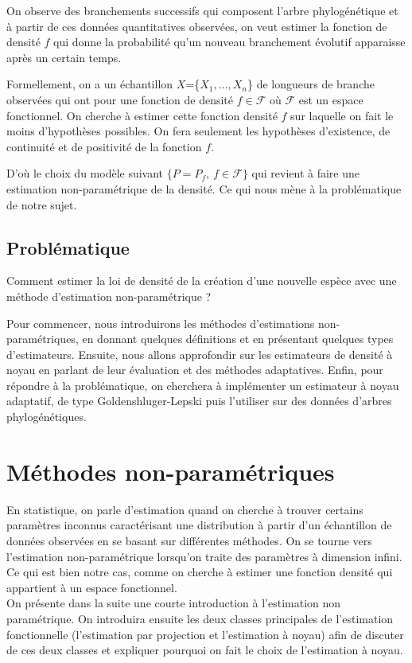\documentclass[
]{article}
\begin{document}
\hspace*{0.5cm}

On observe des branchements successifs qui composent l'arbre
phylogénétique et à partir de ces données quantitatives observées, on
veut estimer la fonction de densité \(f\) qui donne la probabilité qu'un
nouveau branchement évolutif apparaisse après un certain temps.

Formellement, on a un échantillon \(X\)=\{\(X_1,\dots,X_n\)\} de
longueurs de branche observées qui ont pour une fonction de densité
\(f \in \mathcal F\) où \(\mathcal F\) est un espace fonctionnel. On
cherche à estimer cette fonction densité \(f\) sur laquelle on fait le
moins d'hypothèses possibles. On fera seulement les hypothèses
d'existence, de continuité et de positivité de la fonction \(f\).

D'où le choix du modèle suivant \(\{P=P_f,~f\in \mathcal F\}\) qui
revient à faire une estimation non-paramétrique de la densité. Ce qui
nous mène à la problématique de notre sujet.

\subsection{Problématique}

Comment estimer la loi de densité de la création d'une nouvelle espèce
avec une méthode d'estimation non-paramétrique ?

Pour commencer, nous introduirons les méthodes d'estimations
non-paramétriques, en donnant quelques définitions et en présentant
quelques types d'estimateurs. Ensuite, nous allons approfondir sur les
estimateurs de densité à noyau en parlant de leur évaluation et des
méthodes adaptatives. Enfin, pour répondre à la problématique, on
cherchera à implémenter un estimateur à noyau adaptatif, de type
Goldenshluger-Lepski puis l'utiliser sur des données d'arbres
phylogénétiques.

\newpage

\section{Méthodes non-paramétriques}

\hspace*{0.5cm} En statistique, on parle d'estimation quand on cherche à
trouver certains paramètres inconnus caractérisant une distribution à
partir d'un échantillon de données observées en se basant sur
différentes méthodes. On se tourne vers l'estimation non-paramétrique
lorsqu'on traite des paramètres à dimension infini. Ce qui est bien
notre cas, comme on cherche à estimer une fonction densité qui
appartient à un espace fonctionnel.\\
\hspace*{0.5cm} On présente dans la suite une courte introduction à
l'estimation non paramétrique. On introduira ensuite les deux classes
principales de l'estimation fonctionnelle (l'estimation par projection
et l'estimation à noyau) afin de discuter de ces deux classes et
expliquer pourquoi on fait le choix de l'estimation à noyau.
\end{document}
